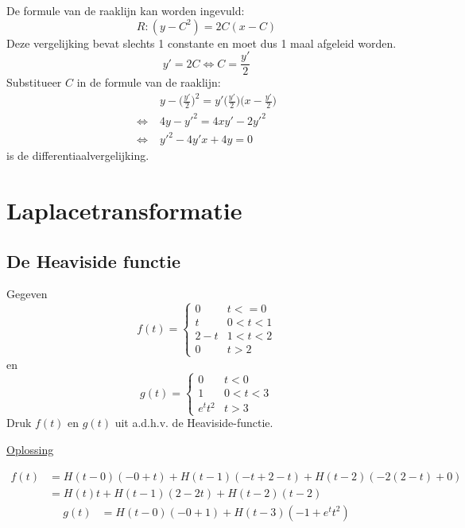 \documentclass[12pt]{report}
\newcommand{\exercise}[2]{
  #1
  

  \underline{Oplossing}
  
  #2
  
  \hrulefill
}
\begin{document}
{\begin{enumerate}
  De formule van de raaklijn kan worden ingevuld:
  $$R: (y - C^2) = 2C(x - C)$$
  Deze vergelijking bevat slechts 1 constante en moet dus 1 maal afgeleid worden.
  $$y' = 2C \Leftrightarrow C = \frac{y'}{2}$$
  Substitueer $C$ in de formule van de raaklijn:
  \begin{equation*}
   \begin{split}
    & y - \bigg(\frac{y'}{2}\bigg)^2 = y'\bigg(\frac{y'}{2}\bigg)\bigg(x - \frac{y'}{2}\bigg) \\
    \Leftrightarrow \; & 4y - y'^2 = 4xy' - 2y'^2 \\
    \Leftrightarrow \; & y'^2 - 4y'x + 4y = 0
   \end{split}
  \end{equation*}
  is de differentiaalvergelijking.
\end{enumerate}
}

\chapter{Laplacetransformatie}
\section{De Heaviside functie}
\exercise{Gegeven 
$$f(t) = \begin{cases}
          0 & t < = 0 \\
          t & 0 < t < 1 \\
          2 - t & 1 < t < 2 \\
          0 & t > 2
         \end{cases}
$$ 
en
$$g(t) = \begin{cases}
          0 & t < 0 \\
          1 & 0 < t < 3 \\
          e^tt^2 & t > 3
         \end{cases}
$$
Druk $f(t)$ en $g(t)$ uit a.d.h.v. de Heaviside-functie.}{
\begin{equation*}
 \begin{split}
  f(t) & = H(t- 0)(-0 + t) + H(t - 1)(-t + 2 -t) + H(t - 2)(-2(2-t) + 0) \\
       & = H(t)t + H(t-1)(2-2t) + H(t-2)(t-2)
 \end{split}
\end{equation*}
\begin{equation*}
 \begin{split}
  g(t) & = H(t - 0)(-0 + 1) + H(t - 3)(-1 + e^tt^2)
 \end{split}
\end{equation*}
}
\end{document}
